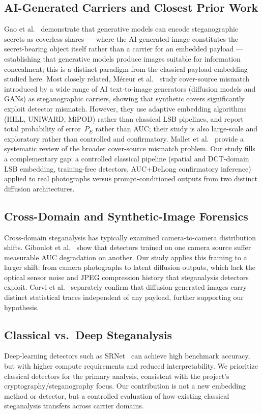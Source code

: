 \documentclass[10pt,twocolumn,a4paper]{article}
\begin{document}
\subsection{AI-Generated Carriers and Closest Prior Work}
Gao et al.~\cite{gao2022ai} demonstrate that generative models can encode steganographic secrets as coverless shares --- where the AI-generated image constitutes the secret-bearing object itself rather than a carrier for an embedded payload --- establishing that generative models produce images suitable for information concealment; this is a distinct paradigm from the classical payload-embedding studied here. Most closely related, M\'{e}reur et al.~\cite{mereur2024deepfake} study cover-source mismatch introduced by a wide range of AI text-to-image generators (diffusion models and GANs) as steganographic carriers, showing that synthetic covers significantly exploit detector mismatch. However, they use adaptive embedding algorithms (HILL, UNIWARD, MiPOD) rather than classical LSB pipelines, and report total probability of error~$P_E$ rather than AUC; their study is also large-scale and exploratory rather than controlled and confirmatory. Mallet et al.~\cite{mallet2024csm} provide a systematic review of the broader cover-source mismatch problem. Our study fills a complementary gap: a controlled classical pipeline (spatial and DCT-domain LSB embedding, training-free detectors, AUC+DeLong confirmatory inference) applied to real photographs versus prompt-conditioned outputs from two distinct diffusion architectures.

\subsection{Cross-Domain and Synthetic-Image Forensics}
\label{sec:crossdomain}
Cross-domain steganalysis has typically examined camera-to-camera distribution shifts. Giboulot et al.~\cite{giboulot2020csm} show that detectors trained on one camera source suffer measurable AUC degradation on another. Our study applies this framing to a larger shift: from camera photographs to latent diffusion outputs, which lack the optical sensor noise and JPEG compression history that steganalysis detectors exploit. Corvi et al.~\cite{corvi2023diffusion} separately confirm that diffusion-generated images carry distinct statistical traces independent of any payload, further supporting our hypothesis.

\subsection{Classical vs.\ Deep Steganalysis}
Deep-learning detectors such as SRNet~\cite{boroumand2019srnet} can achieve high benchmark accuracy, but with higher compute requirements and reduced interpretability. We prioritize classical detectors for the primary analysis, consistent with the project's cryptography/steganography focus. Our contribution is not a new embedding method or detector, but a controlled evaluation of how existing classical steganalysis transfers across carrier domains.
\end{document}
